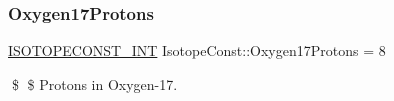 \subsubsection{\texorpdfstring{Oxygen17\+Protons}{Oxygen17Protons}}
{\footnotesize\ttfamily \mbox{\hyperlink{group___isotope_const-_macros_ga5f18360b3e99483a35c32d789e62621c}{I\+S\+O\+T\+O\+P\+E\+C\+O\+N\+S\+T\+\_\+\+I\+NT}} Isotope\+Const\+::\+Oxygen17\+Protons = 8}

\$ \$ Protons in Oxygen-\/17. 